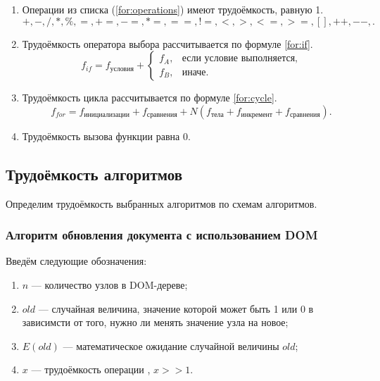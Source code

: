 \begin{enumerate}[label=\arabic*)]
	\item Операции из списка (\ref{for:operations}) имеют трудоёмкость, равную 1.
	\begin{equation}
		\label{for:operations}
		+, -, /, *, \%, =, +=, -=, *=, ==, !=, <, >, <=, >=, [], ++, {-}-, . 
	\end{equation}
	\item Трудоёмкость оператора выбора  рассчитывается по формуле \ref{for:if}.
	\begin{equation}
		\label{for:if}
		f_{if} = f_{\text{условия}} +
		\begin{cases}
			f_A, & \text{если условие выполняется,}\\
			f_B, & \text{иначе.}
		\end{cases}
	\end{equation}
	\item Трудоёмкость цикла рассчитывается по формуле \ref{for:cycle}.
	\begin{equation}
		\label{for:cycle}
		f_{for} = f_{\text{инициализации}} + f_{\text{сравнения}} + N(f_{\text{тела}} + f_{\text{инкремент}} + f_{\text{сравнения}}).
	\end{equation}
	\item Трудоёмкость вызова функции равна 0.
\end{enumerate}


\subsection{Трудоёмкость алгоритмов}

Определим трудоёмкость выбранных алгоритмов по схемам алгоритмов.

\subsubsection{Алгоритм обновления документа с использованием DOM}

Введём следующие обозначения:
\begin{enumerate}[label=\arabic*)]
	\item $n$ --- количество узлов в DOM-дереве;
	\item $old$ --- случайная величина, значение которой может быть 1 или 0 в зависимсти от того, нужно ли менять значение узла на новое;
	\item $E(old)$ --- математическое ожидание случайной величины $old$;
	\item $x$ --- трудоёмкость операции , $x >> 1$.
\end{enumerate}

